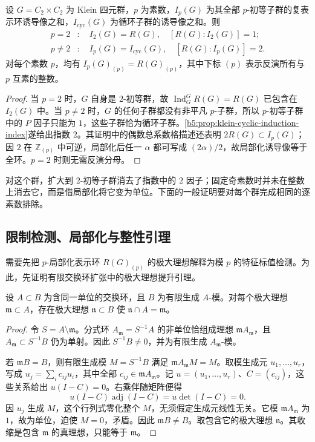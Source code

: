 \begin{proposition}\label{b5:prop:klein-elementary-local-indices}
	设 \(G=C_2\times C_2\) 为 Klein 四元群，\(p\) 为素数，\(I_p(G)\) 为其全部 \(p\)-初等子群的复表示环诱导像之和，\(I_{\mathrm{cyc}}(G)\) 为循环子群的诱导像之和。则
	\[
		\begin{aligned}
			p=2&:\quad I_2(G)=R(G),\quad [R(G):I_2(G)]=1;\\
			p\ne2&:\quad I_p(G)=I_{\mathrm{cyc}}(G),\quad [R(G):I_p(G)]=2.
		\end{aligned}
	\]
	对每个素数 \(p\)，均有 \(I_p(G)_{(p)}=R(G)_{(p)}\)，其中下标 \((p)\) 表示反演所有与 \(p\) 互素的整数。
\end{proposition}
\begin{proof}
	当 \(p=2\) 时，\(G\) 自身是 \(2\)-初等群，故 \(\operatorname{Ind}_G^G R(G)=R(G)\) 已包含在 \(I_2(G)\) 中。当 \(p\ne2\) 时，\(G\) 的任何子群都没有非平凡 \(p\)-子群，所以 \(p\)-初等子群中的 \(P\) 因子只能为 \(1\)，这些子群恰为循环子群。\cref{b5:prop:klein-cyclic-induction-index}遂给出指数 \(2\)。其证明中的偶数总系数格描述还表明 \(2R(G)\subset I_p(G)\)；因 \(2\) 在 \(\mathbb Z_{(p)}\) 中可逆，局部化后任一 \(\alpha\) 都可写成 \((2\alpha)/2\)，故局部化诱导像等于全环。\(p=2\) 时则无需反演分母。
\end{proof}

对这个群，扩大到 \(2\)-初等子群消去了指数中的 \(2\) 因子；固定奇素数时并未在整数上消去它，而是借局部化将它变为单位。下面的一般证明要对每个群完成相同的逐素数排除。

\subsection{限制检测、局部化与整性引理}
\label{b5:subsec:0504:02}

需要先把 \(p\)-局部化表示环 \(R(G)_{(p)}\) 的极大理想解释为模 \(p\) 的特征标值检测。为此，先证明有限交换环扩张中的极大理想提升引理。

\begin{lemma}[有限扩张中的极大理想提升]\label{b5:lem:finite-extension-maximal-lift}
	设 \(A\subset B\) 为含同一单位的交换环，且 \(B\) 为有限生成 \(A\)-模。对每个极大理想 \(\mathfrak m\subset A\)，存在极大理想 \(\mathfrak n\subset B\) 使 \(\mathfrak n\cap A=\mathfrak m\)。
\end{lemma}
\begin{proof}
	令 \(S=A\setminus\mathfrak m\)。分式环 \(A_{\mathfrak m}=S^{-1}A\) 的非单位恰组成理想 \(\mathfrak mA_{\mathfrak m}\)，且 \(A_{\mathfrak m}\subset S^{-1}B\) 仍为单射。因此 \(S^{-1}B\ne0\)，并为有限生成 \(A_{\mathfrak m}\)-模。

	若 \(\mathfrak mB=B\)，则有限生成模 \(M=S^{-1}B\) 满足 \(\mathfrak mA_{\mathfrak m}M=M\)。取模生成元 \(u_1,\ldots,u_r\)，写成 \(u_j=\sum_i c_{ij}u_i\)，其中全部 \(c_{ij}\in\mathfrak mA_{\mathfrak m}\)。记 \(u=(u_1,\ldots,u_r)\)、\(C=(c_{ij})\)，这些关系给出 \(u(I-C)=0\)。右乘伴随矩阵便得
	\[
		u(I-C)\operatorname{adj}(I-C)=u\det(I-C)=0.
	\]
	因 \(u_j\) 生成 \(M\)，这个行列式零化整个 \(M\)，无须假定生成元线性无关。它模 \(\mathfrak mA_{\mathfrak m}\) 为 \(1\)，故为单位，迫使 \(M=0\)，矛盾。因此 \(\mathfrak mB\ne B\)。取包含它的极大理想 \(\mathfrak n\)。其收缩是包含 \(\mathfrak m\) 的真理想，只能等于 \(\mathfrak m\)。
\end{proof}

